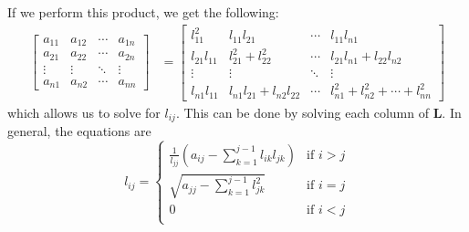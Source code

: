\documentclass{article}
\begin{document}
If we perform this product, we get the following:
\begin{align*}
    \begin{bmatrix*}
        a_{11} & a_{12} & \cdots & a_{1n} \\
        a_{21} & a_{22} & \cdots & a_{2n} \\
        \vdots & \vdots & \ddots & \vdots \\
        a_{n1} & a_{n2} & \cdots & a_{nn}
    \end{bmatrix*} & = \begin{bmatrix*}
                           l_{11}^2        & l_{11} l_{21} & \cdots & l_{11} l_{n1} \\
                           l_{21} l_{11} & l_{21}^2 + l_{22}^2 & \cdots & l_{21} l_{n1} + l_{22} l_{n2} \\
                           \vdots        & \vdots & \ddots & \vdots \\
                           l_{n1} l_{11} & l_{n1} l_{21} + l_{n2} l_{22} & \cdots & l_{n1}^2 + l_{n2}^2 + \cdots + l_{nn}^2
                       \end{bmatrix*}
\end{align*}
which allows us to solve for \(l_{ij}\). This can be done by solving each column of \(\symbf{L}\).
In general, the equations are
\begin{equation*}
    l_{ij} = \begin{cases}
        \frac{1}{l_{jj}} \left( a_{ij} - \sum_{k = 1}^{j - 1} l_{ik} l_{jk} \right) & \text{if \(i > j\)} \\
        \sqrt{a_{jj} - \sum_{k = 1}^{j - 1} l_{jk}^2}                               & \text{if \(i = j\)} \\
        0                                                                           & \text{if \(i < j\)} \\
    \end{cases}
\end{equation*}
\end{document}

